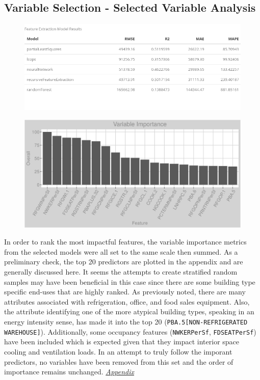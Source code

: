 \subsection{Variable Selection - Selected Variable Analysis}
\begin{figure}[h]
\centering
\includegraphics[width=.8\textwidth, height=0.25\textheight]{Images/electricity_psf_fe_summary.png}
\end{figure}
\begin{figure}[h]
\centering
\includegraphics[width=.99\textwidth, height=0.375\textheight]{Images/electricity_psf_all_vars.png}
\end{figure}
\FloatBarrier

In order to rank the most impactful features, the variable importance metrics from the selected models were all set to the same scale then summed.  As a preliminary check, the top 20 predictors are plotted in the appendix and are generally discussed here.  It seems the attempts to create stratified random samples may have been beneficial in this case since there are some building type specific end-uses that are highly ranked.  As previously noted, there are many attributes associated with refrigeration, office, and food sales equipment.  Also, the attribute identifying one of the more atypical building types, speaking in an energy intensity sense, has made it into the top 20 (\lstinline{PBA.5[NON-REFRIGERATED WAREHOUSE]}).  Additionally, some occupancy features (\lstinline{NWKERPerSf}, \lstinline{FDSEATPerSf}) have been included which is expected given that they impact interior space cooling and ventilation loads. In an attempt to truly follow the imporant predictors, no variables have been removed from this set and the order of importance remains unchanged.  \textit{\hyperref[appendix:electricity:sva]{Appendix}}
